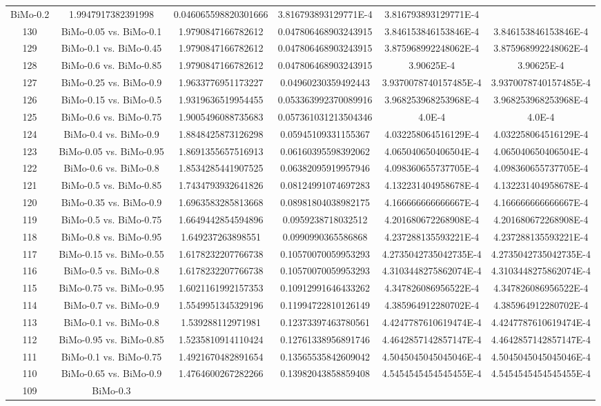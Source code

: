 \documentclass[a4paper,10pt]{article}
\begin{document}
\begin{landscape}
\begin{table}[!htp]
\begin{tabular}{cccccc}
BiMo-0.2&1.9947917382391998&0.046065598820301666&3.816793893129771E-4&3.816793893129771E-4\\130&BiMo-0.05 vs. BiMo-0.1&1.9790847166782612&0.047806468903243915&3.846153846153846E-4&3.846153846153846E-4\\129&BiMo-0.1 vs. BiMo-0.45&1.9790847166782612&0.047806468903243915&3.875968992248062E-4&3.875968992248062E-4\\128&BiMo-0.6 vs. BiMo-0.85&1.9790847166782612&0.047806468903243915&3.90625E-4&3.90625E-4\\127&BiMo-0.25 vs. BiMo-0.9&1.9633776951173227&0.04960230359492443&3.9370078740157485E-4&3.9370078740157485E-4\\126&BiMo-0.15 vs. BiMo-0.5&1.9319636519954455&0.053363992370089916&3.968253968253968E-4&3.968253968253968E-4\\125&BiMo-0.6 vs. BiMo-0.75&1.9005496088735683&0.057361031213504346&4.0E-4&4.0E-4\\124&BiMo-0.4 vs. BiMo-0.9&1.8848425873126298&0.05945109331155367&4.032258064516129E-4&4.032258064516129E-4\\123&BiMo-0.05 vs. BiMo-0.95&1.8691355657516913&0.06160395598392062&4.065040650406504E-4&4.065040650406504E-4\\122&BiMo-0.6 vs. BiMo-0.8&1.8534285441907525&0.06382095919957946&4.098360655737705E-4&4.098360655737705E-4\\121&BiMo-0.5 vs. BiMo-0.85&1.7434793932641826&0.08124991074697283&4.132231404958678E-4&4.132231404958678E-4\\120&BiMo-0.35 vs. BiMo-0.9&1.6963583285813668&0.08981804038982175&4.166666666666667E-4&4.166666666666667E-4\\119&BiMo-0.5 vs. BiMo-0.75&1.6649442854594896&0.0959238718032512&4.201680672268908E-4&4.201680672268908E-4\\118&BiMo-0.8 vs. BiMo-0.95&1.649237263898551&0.0990990365586868&4.237288135593221E-4&4.237288135593221E-4\\117&BiMo-0.15 vs. BiMo-0.55&1.6178232207766738&0.10570070059953293&4.2735042735042735E-4&4.2735042735042735E-4\\116&BiMo-0.5 vs. BiMo-0.8&1.6178232207766738&0.10570070059953293&4.3103448275862074E-4&4.3103448275862074E-4\\115&BiMo-0.75 vs. BiMo-0.95&1.6021161992157353&0.10912991646433262&4.347826086956522E-4&4.347826086956522E-4\\114&BiMo-0.7 vs. BiMo-0.9&1.5549951345329196&0.11994722810126149&4.385964912280702E-4&4.385964912280702E-4\\113&BiMo-0.1 vs. BiMo-0.8&1.539288112971981&0.12373397463780561&4.4247787610619474E-4&4.4247787610619474E-4\\112&BiMo-0.95 vs. BiMo-0.85&1.5235810914110424&0.12761338956891746&4.4642857142857147E-4&4.4642857142857147E-4\\111&BiMo-0.1 vs. BiMo-0.75&1.4921670482891654&0.13565535842609042&4.5045045045045046E-4&4.5045045045045046E-4\\110&BiMo-0.65 vs. BiMo-0.9&1.4764600267282266&0.13982043858859408&4.5454545454545455E-4&4.5454545454545455E-4\\109&BiMo-0.3 
\end{tabular}
\end{table}
\end{landscape}
\end{document}
